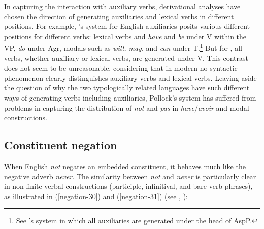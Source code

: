 \documentclass[output=paper
	        ,collection
	        ,collectionchapter
 	        ,biblatex
                ,babelshorthands
                ,newtxmath
                ,draftmode
                ,colorlinks, citecolor=brown
]{langscibook}
\begin{document}
\begin{exe}
\begin{xlist}
\begin{exe}
\begin{xlist}
{In capturing the interaction with auxiliary verbs, derivational analyses have chosen the direction of generating
auxiliaries and lexical  verbs in different positions. For example,
\citet{Pollock:89}'s system for English auxiliaries posits
various different positions for different verbs: lexical
verbs and \textit{have} and \textit{be} under V within the VP,
\textit{do} under Agr, modals such as \textit{will, may}, and \textit{can}
under T.\footnote{See \citep{Ouhalla:91}'s system in which
all auxiliaries are generated under the head of AspP.} But for ,
all verbs, whether
auxiliary or lexical  verbs, are generated under V.
This contrast does not seem to be unreasonable, considering that in
modern  no syntactic phenomenon clearly distinguishes auxiliary
verbs and lexical  verbs. Leaving aside the question of why the two
typologically related languages have such different ways of generating
verbs including auxiliaries, Pollock's system has suffered
from problems in capturing the distribution of \textit{not} and
\textit{pas} in \textit{have}/\textit{avoir} and modal constructions.}
\fi

\subsection{Constituent negation}

When English \textit{not} negates an embedded constituent, it behaves
much like the negative adverb \textit{never}. The similarity between {\it
not} and \textit{never} is particularly clear in non-finite verbal
constructions (participle, infinitival, and bare verb phrases), as
illustrated in (\ref{negation-30}) and (\ref{negation-31}) (see \citealt{Klima:64,Kim:00},
\citealt[]{kimmichaelis:2020}):

\eal\label{negation-30}
\zl


\end{xlist}
\end{exe}
\end{xlist}
\end{exe}
\end{document}

